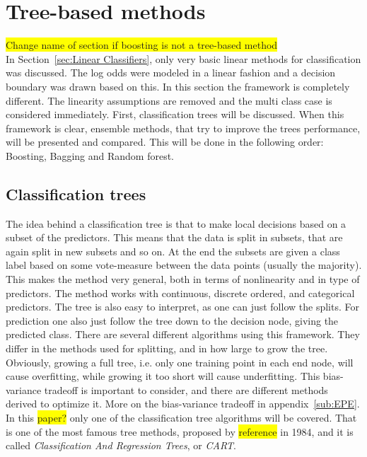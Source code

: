 \section{Tree-based methods}
\label{sec:Tree-based methods}
\colorbox{yellow}{Change name of section if boosting is not a tree-based method}\\
In Section~\ref{sec:Linear Classifiers}, only very basic linear methods for classification was discussed. The log odds were modeled in a linear fashion and a decision boundary was drawn based on this. In this section the framework is completely different. The linearity assumptions are removed and the multi class case is considered immediately. 
First, classification trees will be discussed. When this framework is clear, ensemble methods, that try to improve the trees performance, will be presented and compared. This will be done in the following order: Boosting, Bagging and Random forest. 
%
\subsection{Classification trees}
\label{sub:Classification trees}
The idea behind a classification tree is that to make local decisions based on a subset of the predictors. This means that the data is split in subsets, that are again split in new subsets and so on. At the end the subsets are given a class label based on some vote-measure between the data points (usually the majority).
This makes the method very general, both in terms of nonlinearity and in type of predictors. The method works with continuous, discrete ordered, and categorical predictors. The tree is also easy to interpret, as one can just follow the splits. For prediction one also just follow the tree down to the decision node, giving the predicted class. There are several different algorithms using this framework. They differ in the methods used for splitting, and in how large to grow the tree. Obviously, growing a full tree, i.e. only one training point in each end node, will cause overfitting, while growing it too short will cause underfitting. This bias-variance tradeoff is important to consider, and there are different methods derived to optimize it. More on the bias-variance tradeoff in appendix~\ref{sub:EPE}. In this \colorbox{yellow}{paper?} only one of the classification tree algorithms will be covered. That is one of the most famous tree methods, proposed by \colorbox{yellow}{reference} \cite{breiman} in 1984, and it is called \textit{Classification And Regression Trees}, or \textit{CART}.
%

